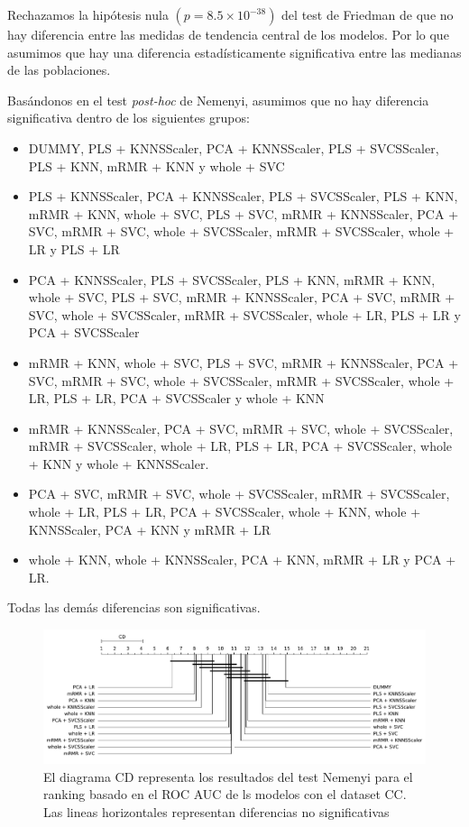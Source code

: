 \documentclass[a4paper,oneside,11pt,leqno]{article}
\begin{document}
	Rechazamos la hipótesis nula $(p=8.5\times 10^{-38})$ del test de Friedman de que no hay diferencia entre las medidas de tendencia central de los modelos. Por lo que asumimos que hay una diferencia estadísticamente significativa entre las medianas de las poblaciones.

	Basándonos en el test \textit{post-hoc} de Nemenyi, asumimos que no hay diferencia significativa dentro de los siguientes grupos:

	\begin{itemize}
		\item DUMMY, PLS + KNNSScaler, PCA + KNNSScaler, PLS + SVCSScaler, PLS + KNN, mRMR + KNN y whole + SVC


		\item PLS + KNNSScaler, PCA + KNNSScaler, PLS + SVCSScaler, PLS + KNN, mRMR + KNN, whole + SVC, PLS + SVC, mRMR + KNNSScaler, PCA + SVC, mRMR + SVC, whole + SVCSScaler, mRMR + SVCSScaler, whole + LR y PLS + LR

		\item PCA + KNNSScaler, PLS + SVCSScaler, PLS + KNN, mRMR + KNN, whole + SVC, PLS + SVC, mRMR + KNNSScaler, PCA + SVC, mRMR + SVC, whole + SVCSScaler, mRMR + SVCSScaler, whole + LR, PLS + LR y PCA + SVCSScaler

		\item mRMR + KNN, whole + SVC, PLS + SVC, mRMR + KNNSScaler, PCA + SVC, mRMR + SVC, whole + SVCSScaler, mRMR + SVCSScaler, whole + LR, PLS + LR, PCA + SVCSScaler y whole + KNN

		\item  mRMR + KNNSScaler, PCA + SVC, mRMR + SVC, whole + SVCSScaler, mRMR + SVCSScaler, whole + LR, PLS + LR, PCA + SVCSScaler, whole + KNN y whole + KNNSScaler.

		\item  PCA + SVC, mRMR + SVC, whole + SVCSScaler, mRMR + SVCSScaler, whole + LR, PLS + LR, PCA + SVCSScaler, whole + KNN, whole + KNNSScaler, PCA + KNN y mRMR + LR

		\item  whole + KNN, whole + KNNSScaler, PCA + KNN, mRMR + LR y PCA + LR.
	\end{itemize}

	Todas las demás diferencias son significativas.

	\begin{figure}[h]
		\includegraphics[width=\linewidth]{stat_results_cc.pdf}
		\caption{El diagrama CD representa los resultados del test Nemenyi para el ranking basado en el ROC AUC de ls modelos con el dataset CC. Las lineas horizontales representan diferencias no significativas}
		\label{fig:stats_fig_cc}
	\end{figure}
\end{document}
